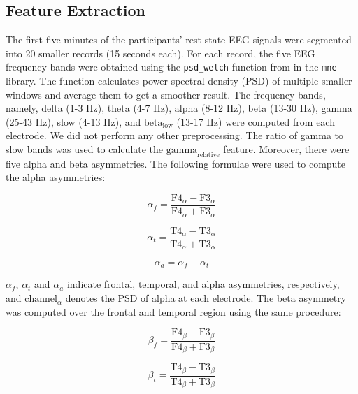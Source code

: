 \documentclass[pdflatex,sn-mathphys]{sn-jnl}%
\theoremstyle{thmstyleone}%
\theoremstyle{thmstyletwo}%
\theoremstyle{thmstylethree}%
\begin{document}
\subsection{Feature Extraction}\label{method:featureExtraction}

The first five minutes of the participants' rest-state EEG signals were segmented into 20 smaller records (15 seconds each). For each record, the five EEG frequency bands were obtained using the \texttt{psd\_welch} function from in the \texttt{mne} library. The function calculates power spectral density (PSD) of multiple smaller windows and average them to get a smoother result. The frequency bands, namely, delta (1-3 Hz), theta (4-7 Hz), alpha (8-12 Hz), beta (13-30 Hz), gamma (25-43 Hz), slow (4-13 Hz), and $\text{beta}_{\text{low}}$ (13-17 Hz) were computed from each electrode. We did not perform any other preprocessing. The ratio of gamma to slow bands was used to calculate the $\text{gamma}_{\text{relative}}$ feature. Moreover, there were five alpha and beta asymmetries. The following formulae were used to compute the alpha asymmetries:

\begin{equation} \label{eq:3}
   \alpha_{f} =\frac{ \text{F4}_{\alpha} - \text{F3}_{\alpha} }{ \text{F4}_{\alpha} + \text{F3}_{\alpha} }
\end{equation}

\begin{equation} \label{eq:4}
    \alpha_{t} =\frac{ \text{T4}_{\alpha} - \text{T3}_{\alpha} }{ \text{T4}_{\alpha} + \text{T3}_{\alpha} }
\end{equation}

\begin{equation} \label{eq:5}
   \alpha_{a} ={\alpha_{f}+\alpha_{t}}
\end{equation}

$\alpha_{f}$, $\alpha_{t}$ and $\alpha_{a}$ indicate frontal, temporal, and alpha asymmetries, respectively, and $\text{channel}_\alpha$ denotes the PSD of alpha at each electrode. The beta asymmetry was computed over the frontal and temporal region using the same procedure:

\begin{equation} \label{eq:6}
    \beta_{f} =\frac{ \text{F4}_{\beta} - \text{F3}_{\beta} }{ \text{F4}_{\beta} + \text{F3}_{\beta} }
\end{equation}

\begin{equation} \label{eq:7}
    \beta_{t} =\frac{ \text{T4}_{\beta} - \text{T3}_{\beta} }{ \text{T4}_{\beta} + \text{T3}_{\beta} }
\end{equation}
\end{document}
